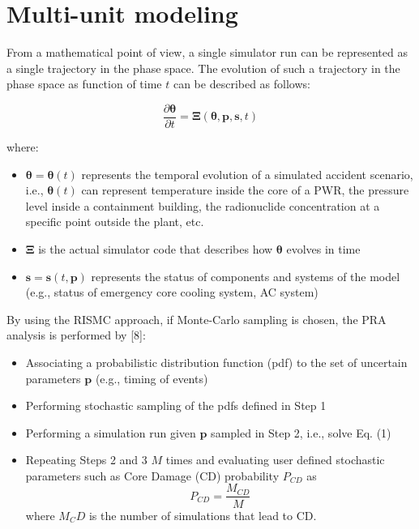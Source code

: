 \section{Multi-unit modeling}
\label{sec:multiUnitModeling}

From a mathematical point of view, a single simulator run can be represented 
as a single trajectory in the phase space. The evolution of such a trajectory 
in the phase space as function of time $t$ can be described as follows:

\begin{equation}
    \frac{\partial \boldsymbol \theta }{\partial t}  = \boldsymbol \Xi (\boldsymbol \theta , \boldsymbol p, \boldsymbol s , t) 
    \label{eq:trajectory}
\end{equation}

where:
\begin{itemize}
  \item $\boldsymbol \theta = \boldsymbol \theta(t)$ represents the temporal 
        evolution of a simulated accident scenario, i.e., $\boldsymbol \theta(t)$ can 
        represent temperature inside the core of a PWR, the pressure level inside a containment
        building, the radionuclide concentration at a specific point outside the plant, etc.
  \item $\boldsymbol \Xi$ is the actual simulator code that describes how $\boldsymbol \theta$ 
        evolves in time
  \item $\boldsymbol s = \boldsymbol s(t,\boldsymbol p)$ represents the status of components 
        and systems of the model (e.g., status of emergency core cooling system, AC system)
\end{itemize}

By using the RISMC approach, if Monte-Carlo sampling is chosen, the PRA analysis is performed by [8]:
\begin{itemize}
  \item Associating a probabilistic distribution function (pdf) to the set of uncertain 
        parameters $\boldsymbol p$ (e.g., timing of events)
  \item Performing stochastic sampling of the pdfs defined in Step 1
  \item Performing a simulation run given $\boldsymbol p$ sampled in Step 2, i.e., solve Eq. (1)
  \item Repeating Steps 2 and 3 $M$ times and evaluating user defined stochastic parameters such as 
        Core Damage (CD) probability $P_{CD}$ as
        \begin{equation}
            P_{CD} = \frac{M_{CD}}{M} 
            \label{eq:CDprobability}
        \end{equation}
        where $M_CD$ is the number of simulations that lead to CD. 
\end{itemize}

